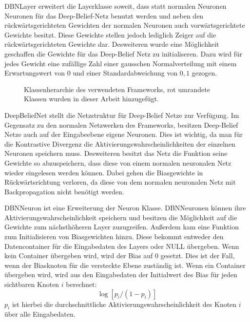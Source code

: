 \documentclass[12pt]{article}
\begin{document}
DBNLayer erweitert die Layerklasse soweit, dass statt normalen Neuronen Neuronen für das Deep-Belief-Netz benutzt werden und neben den rückwärtsgerichteten Gewichten der normalen Neuronen auch vorwärtsgerichtete Gewichte besitzt. Diese Gewichte stellen jedoch lediglich Zeiger auf die rückwärtsgerichteten Gewichte dar. Desweiteren wurde eine Möglichkeit geschaffen die Gewichte für das Deep-Belief Netz zu initialiseren. Dazu wird für jedes Gewicht eine zufällige Zahl einer gausschen Normalverteilung mit einem Erwartungswert von 0 und einer Standardabweichung von $0,1$ gezogen.
\begin{figure}[H]
	\center
	
	\caption{Klassenherarchie des verwendeten Frameworks, rot umrandete Klassen wurden in dieser Arbeit hinzugefügt.}
	\label{Aufbau}
\end{figure}
DeepBeliefNet stellt die Netzstruktur für Deep-Belief Netze zur Verfügung. Im Gegensatz zu den normalen Netzwerken des Frameworks, besitzen Deep-Belief Netze auch auf der Eingabeebene eigene Neuronen. Dies ist wichtig, da man für die Kontrastive Divergenz die Aktivierungswahrscheinlichkeiten der einzelnen Neuronen speichern muss. Desweiteren besitzt das Netz die Funktion seine Gewichte so abzuspeichern, dass diese von einem normalen neuronalen Netz wieder eingelesen werden können. Dabei gehen die Biasgewichte in Rückwärtsrichtung verloren, da diese von dem normalen neuronalen Netz mit Backpropagation nicht benötigt werden.

DBNNeuron ist eine Erweiterung der Neuron Klasse. DBNNeuronen können ihre Aktivierungswahrscheinlichkeit speichern und besitzen die Möglichkeit auf die Gewichte zum nächsthöheren Layer zuzugreifen. Außerdem kam eine Funktion zum Initialisieren von Biasgewichten hinzu. Diese bekommt entweder den Datencontainer für die Eingabedaten des Layers oder NULL übergeben. Wenn kein Container übergeben wird, wird der Bias auf 0 gesetzt. Dies ist der Fall, wenn der Biasknoten für die versteckte Ebene zuständig ist. Wenn ein Container übergeben wird, wird aus den Eingabedaten der Initialwert des Bias für jeden sichtbaren Knoten $i$ berechnet:
\begin{equation}
\log [p_i/(1-p_i)]
\end{equation}
$p_i$ ist hierbei die durchschnittliche Aktivierungswahrscheinlichkeit des Knoten $i$ über alle Eingabedaten.
\end{document}
